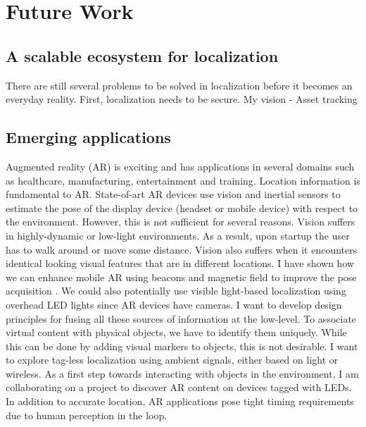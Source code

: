 \documentclass[10pt]{article}
\begin{document}
\section{Future Work}
\subsection{A scalable ecosystem for localization}
There are still several problems to be solved in localization before it becomes an everyday reality. First, localization needs to be secure. 
My vision - Asset tracking

\subsection{Emerging applications}
Augmented reality (AR) is exciting and has applications in several domains such as healthcare, manufacturing, entertainment and training. Location information is fundamental to AR. State-of-art AR devices use vision and inertial sensors to estimate the pose of the display device (headset or mobile device) with respect to the environment. However, this is not sufficient for several reasons. Vision suffers in highly-dynamic or low-light environments. As a result, upon startup the user has to walk around or move some distance. Vision also suffers when it encounters identical looking visual features that are in different locations. I have shown how we can enhance mobile AR using beacons and magnetic field to improve the pose acquisition \cite{}. We could also potentially use visible light-based localization using overhead LED lights since AR devices have cameras. I want to develop design principles for fusing all these sources of information at the low-level. To associate virtual content with physical objects, we have to identify them uniquely. While this can be done by adding visual markers to objects, this is not desirable. I want to explore tag-less localization using ambient signals, either based on light or wireless. As a first step towards interacting with objects in the environment, I am collaborating on a project to discover AR content on devices tagged with LEDs. In addition to accurate location, AR applications pose tight timing requirements due to human perception in the loop. 
\end{document}
